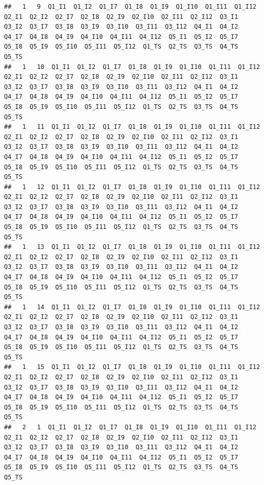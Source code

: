 \documentclass[]{book}
\begin{document}
\begin{verbatim}
##   1   9  Q1_I1  Q1_I2  Q1_I7  Q1_I8  Q1_I9  Q1_I10  Q1_I11  Q1_I12  Q2_I1  Q2_I2  Q2_I7  Q2_I8  Q2_I9  Q2_I10  Q2_I11  Q2_I12  Q3_I1  Q3_I2  Q3_I7  Q3_I8  Q3_I9  Q3_I10  Q3_I11  Q3_I12  Q4_I1  Q4_I2  Q4_I7  Q4_I8  Q4_I9  Q4_I10  Q4_I11  Q4_I12  Q5_I1  Q5_I2  Q5_I7  Q5_I8  Q5_I9  Q5_I10  Q5_I11  Q5_I12  Q1_TS  Q2_TS  Q3_TS  Q4_TS  Q5_TS
##   1   10  Q1_I1  Q1_I2  Q1_I7  Q1_I8  Q1_I9  Q1_I10  Q1_I11  Q1_I12  Q2_I1  Q2_I2  Q2_I7  Q2_I8  Q2_I9  Q2_I10  Q2_I11  Q2_I12  Q3_I1  Q3_I2  Q3_I7  Q3_I8  Q3_I9  Q3_I10  Q3_I11  Q3_I12  Q4_I1  Q4_I2  Q4_I7  Q4_I8  Q4_I9  Q4_I10  Q4_I11  Q4_I12  Q5_I1  Q5_I2  Q5_I7  Q5_I8  Q5_I9  Q5_I10  Q5_I11  Q5_I12  Q1_TS  Q2_TS  Q3_TS  Q4_TS  Q5_TS
##   1   11  Q1_I1  Q1_I2  Q1_I7  Q1_I8  Q1_I9  Q1_I10  Q1_I11  Q1_I12  Q2_I1  Q2_I2  Q2_I7  Q2_I8  Q2_I9  Q2_I10  Q2_I11  Q2_I12  Q3_I1  Q3_I2  Q3_I7  Q3_I8  Q3_I9  Q3_I10  Q3_I11  Q3_I12  Q4_I1  Q4_I2  Q4_I7  Q4_I8  Q4_I9  Q4_I10  Q4_I11  Q4_I12  Q5_I1  Q5_I2  Q5_I7  Q5_I8  Q5_I9  Q5_I10  Q5_I11  Q5_I12  Q1_TS  Q2_TS  Q3_TS  Q4_TS  Q5_TS
##   1   12  Q1_I1  Q1_I2  Q1_I7  Q1_I8  Q1_I9  Q1_I10  Q1_I11  Q1_I12  Q2_I1  Q2_I2  Q2_I7  Q2_I8  Q2_I9  Q2_I10  Q2_I11  Q2_I12  Q3_I1  Q3_I2  Q3_I7  Q3_I8  Q3_I9  Q3_I10  Q3_I11  Q3_I12  Q4_I1  Q4_I2  Q4_I7  Q4_I8  Q4_I9  Q4_I10  Q4_I11  Q4_I12  Q5_I1  Q5_I2  Q5_I7  Q5_I8  Q5_I9  Q5_I10  Q5_I11  Q5_I12  Q1_TS  Q2_TS  Q3_TS  Q4_TS  Q5_TS
##   1   13  Q1_I1  Q1_I2  Q1_I7  Q1_I8  Q1_I9  Q1_I10  Q1_I11  Q1_I12  Q2_I1  Q2_I2  Q2_I7  Q2_I8  Q2_I9  Q2_I10  Q2_I11  Q2_I12  Q3_I1  Q3_I2  Q3_I7  Q3_I8  Q3_I9  Q3_I10  Q3_I11  Q3_I12  Q4_I1  Q4_I2  Q4_I7  Q4_I8  Q4_I9  Q4_I10  Q4_I11  Q4_I12  Q5_I1  Q5_I2  Q5_I7  Q5_I8  Q5_I9  Q5_I10  Q5_I11  Q5_I12  Q1_TS  Q2_TS  Q3_TS  Q4_TS  Q5_TS
##   1   14  Q1_I1  Q1_I2  Q1_I7  Q1_I8  Q1_I9  Q1_I10  Q1_I11  Q1_I12  Q2_I1  Q2_I2  Q2_I7  Q2_I8  Q2_I9  Q2_I10  Q2_I11  Q2_I12  Q3_I1  Q3_I2  Q3_I7  Q3_I8  Q3_I9  Q3_I10  Q3_I11  Q3_I12  Q4_I1  Q4_I2  Q4_I7  Q4_I8  Q4_I9  Q4_I10  Q4_I11  Q4_I12  Q5_I1  Q5_I2  Q5_I7  Q5_I8  Q5_I9  Q5_I10  Q5_I11  Q5_I12  Q1_TS  Q2_TS  Q3_TS  Q4_TS  Q5_TS
##   1   15  Q1_I1  Q1_I2  Q1_I7  Q1_I8  Q1_I9  Q1_I10  Q1_I11  Q1_I12  Q2_I1  Q2_I2  Q2_I7  Q2_I8  Q2_I9  Q2_I10  Q2_I11  Q2_I12  Q3_I1  Q3_I2  Q3_I7  Q3_I8  Q3_I9  Q3_I10  Q3_I11  Q3_I12  Q4_I1  Q4_I2  Q4_I7  Q4_I8  Q4_I9  Q4_I10  Q4_I11  Q4_I12  Q5_I1  Q5_I2  Q5_I7  Q5_I8  Q5_I9  Q5_I10  Q5_I11  Q5_I12  Q1_TS  Q2_TS  Q3_TS  Q4_TS  Q5_TS
##   2   1  Q1_I1  Q1_I2  Q1_I7  Q1_I8  Q1_I9  Q1_I10  Q1_I11  Q1_I12  Q2_I1  Q2_I2  Q2_I7  Q2_I8  Q2_I9  Q2_I10  Q2_I11  Q2_I12  Q3_I1  Q3_I2  Q3_I7  Q3_I8  Q3_I9  Q3_I10  Q3_I11  Q3_I12  Q4_I1  Q4_I2  Q4_I7  Q4_I8  Q4_I9  Q4_I10  Q4_I11  Q4_I12  Q5_I1  Q5_I2  Q5_I7  Q5_I8  Q5_I9  Q5_I10  Q5_I11  Q5_I12  Q1_TS  Q2_TS  Q3_TS  Q4_TS  Q5_TS

\end{verbatim}
\end{document}

